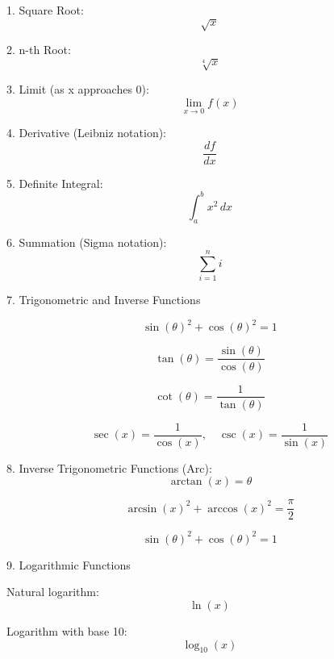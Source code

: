 \documentclass{article}
\begin{document}
1. Square Root:
$$\sqrt{x}$$

2. n-th Root:
$$\sqrt[4]{x}$$

3. Limit (as x approaches 0):
$$\lim_{x \to 0} f(x)$$

4. Derivative (Leibniz notation):
$$\frac{df}{dx}$$

5. Definite Integral:
$$\int_{a}^{b} x^2 \, dx$$

6. Summation (Sigma notation):
$$\sum_{i=1}^{n} i$$

7. Trigonometric and Inverse Functions

$$\sin(\theta)^2 + \cos(\theta)^2 = 1$$

$$\tan(\theta) = \frac{\sin(\theta)}{\cos(\theta)}$$

$$\cot(\theta) = \frac{1}{\tan(\theta)}$$

$$\sec(x) = \frac{1}{\cos(x)}, \quad \csc(x) = \frac{1}{\sin(x)}$$

8. Inverse Trigonometric Functions (Arc):
$$\arctan(x) = \theta$$

$$\arcsin(x)^2 + \arccos(x)^2 = \frac{\pi}{2}$$

$$\sin(\theta)^2 + \cos(\theta)^2 = 1$$

9. Logarithmic Functions

Natural logarithm:
$$\ln(x)$$

Logarithm with base 10:
$$\log_{10}(x)$$
\end{document}
